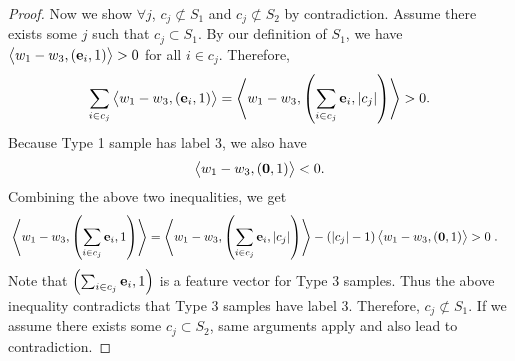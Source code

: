 \begin{proof}
Now we show $\forall j$, $c_j \not\subset S_1$ and $c_j \not\subset S_2$ by
contradiction. Assume there exists some $j$ such that $c_j \subset S_1$. By our
definition of $S_1$, we have $\left\langle w_1-w_3, (\mathbf{e}_i, 1) \right\rangle > 0$ for all $i\in c_j$.
Therefore,
\begin{align*}
\sum_{i\in c_j} \left\langle w_1-w_3, \left(\mathbf{e}_i, 1\right) \right\rangle
 = \left\langle w_1-w_3, \left(\sum_{i\in c_j} \mathbf{e}_i, |c_j|\right) \right\rangle > 0.
\end{align*}
Because Type 1 sample has label $3$, we also have
$$
\left\langle w_1-w_3, \left(\mathbf{0}, 1\right) \right\rangle < 0.
$$
Combining the above two inequalities, we get
\begin{align*}
& \left\langle w_1-w_3, \left(\sum_{i\in c_j}\mathbf{e}_i, 1\right) \right\rangle
 = \left\langle w_1-w_3, \left(\sum_{i\in c_j}\mathbf{e}_i, |c_j|\right) \right\rangle - (|c_j|-1)\left\langle w_1-w_3, \left(\mathbf{0}, 1\right) \right\rangle  > 0 \; .
\end{align*}
Note that $\left(\sum_{i\in c_j}\mathbf{e}_i, 1\right)$ is a feature vector for Type 3
samples. Thus the above inequality contradicts that Type 3 samples have label 3.
Therefore, $c_j \not\subset S_1$. If we assume there exists some $c_j \subset
S_2$, same arguments apply and also lead to contradiction.
\end{proof}
